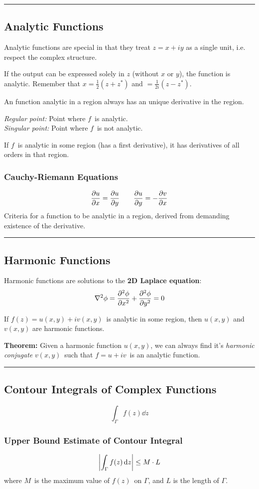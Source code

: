 \documentclass[10pt,a4paper]{article}
\newcommand{\holine}{\rule{286pt}{1pt}}
\newcommand{\half}{\frac{1}{2}}
\begin{document}
\begin{multicols}{2}
\holine
\subsection*{Analytic Functions}
Analytic functions are special in that they treat $z=x+iy$ as a single unit, i.e. respect the complex structure.

If the output can be expressed solely in $z$ (without $x$ or $y$), the function is analytic. Remember that $x = \half (z+z^*)$ and $=\frac{1}{2i}(z-z^*)$.

An function analytic in a region always has an unique derivative in the region.

\textit{Regular point:} Point where $f$ is analytic.\\
\textit{Singular point:} Point where $f$ is not analytic.

If $f$ is analytic in some region (has a first derivative), it has derivatives of all orders in that region.



\subsubsection*{Cauchy-Riemann Equations}
\[
    \pdv{u}{x} = \pdv{u}{y} \quad\quad \pdv{u}{y} = - \pdv{v}{x}
\]
Criteria for a function to be analytic in a region, derived from demanding existence of the derivative.



\holine
\subsection*{Harmonic Functions}
Harmonic functions are solutions to the \textbf{2D Laplace equation}:
\[
    \nabla^2 \phi = \pdv[2]{\phi}{x} + \pdv[2]{\phi}{y} = 0
\]

If $f(z) = u(x,y) + iv(x,y)$ is analytic in some region, then $u(x,y)$ and $v(x,y)$ are harmonic functions.

\textbf{Theorem:} Given a harmonic function $u(x,y)$, we can always find it's \textit{harmonic conjugate} $v(x,y)$ such that $f = u + iv$ is an analytic function.



\holine
\subsection*{Contour Integrals of Complex Functions}
\[
    \int_\Gamma f(z) \dd{z}
\]


\subsubsection*{Upper Bound Estimate of Contour Integral}
\[
    \qty|\int_\Gamma f(z) \dd{z}| \leq M\cdot L
\]
where $M$ is the maximum value of $f(z)$ on $\Gamma$, and $L$ is the length of $\Gamma$.



\end{multicols}
\end{document}
